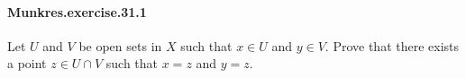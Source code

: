 \documentclass{article}
\begin{document}

\paragraph{Munkres.exercise.31.1} Let $U$ and $V$ be open sets in $X$ such that $x \in U$ and $y \in V$. Prove that there exists a point $z \in U \cap V$ such that $x = z$ and $y = z$.
\end{document}
